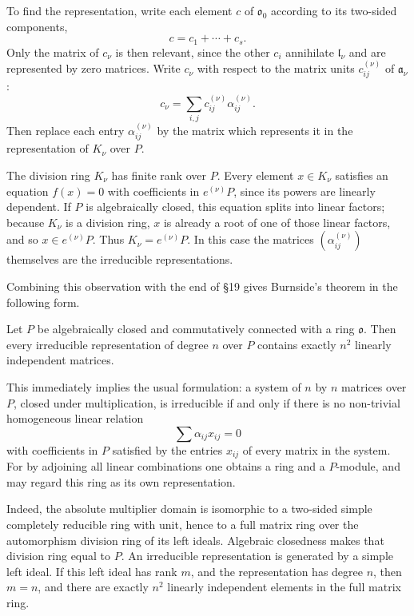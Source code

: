 \documentclass[11pt]{article}
\begin{document}
To find the representation, write each element \(c\) of
\(\mathfrak{o}_0\) according to its two-sided components, \[
  c=c_1+\cdots+c_s.
\] Only the matrix of \(c_\nu\) is then relevant, since the other
\(c_i\) annihilate \(\mathfrak l_\nu\) and are represented by zero
matrices. Write \(c_\nu\) with respect to the matrix units
\(c_{ij}^{(\nu)}\) of \(\mathfrak a_\nu\): \[
  c_\nu=\sum_{i,j} c_{ij}^{(\nu)}\alpha_{ij}^{(\nu)}.
\] Then replace each entry \(\alpha_{ij}^{(\nu)}\) by the matrix which
represents it in the representation of \(K_\nu\) over \(P\).

The division ring \(K_\nu\) has finite rank over \(P\). Every element
\(x\in K_\nu\) satisfies an equation \(f(x)=0\) with coefficients in
\(e^{(\nu)}P\), since its powers are linearly dependent. If \(P\) is
algebraically closed, this equation splits into linear factors; because
\(K_\nu\) is a division ring, \(x\) is already a root of one of those
linear factors, and so \(x\in e^{(\nu)}P\). Thus \(K_\nu=e^{(\nu)}P\).
In this case the matrices \((\alpha_{ij}^{(\nu)})\) themselves are the
irreducible representations.

Combining this observation with the end of §19 gives Burnside's theorem
in the following form.

Let \(P\) be algebraically closed and commutatively connected with a
ring \(\mathfrak{o}\). Then every irreducible representation of degree
\(n\) over \(P\) contains exactly \(n^2\) linearly independent matrices.

This immediately implies the usual formulation: a system of \(n\) by
\(n\) matrices over \(P\), closed under multiplication, is irreducible
if and only if there is no non-trivial homogeneous linear relation \[
  \sum \alpha_{ij}x_{ij}=0
\] with coefficients in \(P\) satisfied by the entries \(x_{ij}\) of
every matrix in the system. For by adjoining all linear combinations one
obtains a ring and a \(P\)-module, and may regard this ring as its own
representation.

Indeed, the absolute multiplier domain is isomorphic to a two-sided
simple completely reducible ring with unit, hence to a full matrix ring
over the automorphism division ring of its left ideals. Algebraic
closedness makes that division ring equal to \(P\). An irreducible
representation is generated by a simple left ideal. If this left ideal
has rank \(m\), and the representation has degree \(n\), then \(m=n\),
and there are exactly \(n^2\) linearly independent elements in the full
matrix ring.
\end{document}
